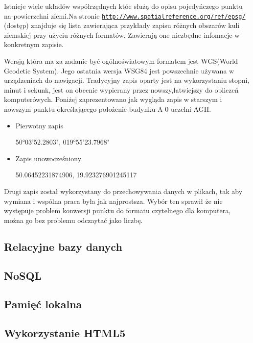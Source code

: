 Istnieje wiele układów współrzędnych któe służą do opisu pojedyńczego punktu na powierzchni ziemi.Na stronie \underline{\texttt{http://www.spatialreference.org/ref/epsg/}} (dostęp) znajduje się lista zawierająca przykłady zapisu różnych obszarów kuli ziemskiej przy użyciu różnych formatów. Zawierają one niezbędne infomacje w konkretnym zapisie.

Wersją która ma za zadanie być ogólnoświatowym formatem jest WGS(World Geodetic System). Jego ostatnia wersja  WSG84 jest powszechnie używana w urządzeniach do nawigacji.
Tradycyjny zapis oparty jest na wykorzystaniu stopni, minut i sekunk, jest on obecnie wypierany przez nowszy,łatwiejszy do obliczeń komputerówych. Poniżej zaprezentowano jak wygląda zapis w starszym i nowszym punktu określającego położenie budynku A-0 uczelni AGH.

\begin{itemize}

\item
Pierwotny zapis

50°03'52.2803", 019°55'23.7968"
\item
Zapis unowocześniony

50.06452231874906, 19.923276901245117
\end{itemize}

Drugi zapis został wykorzystany do przechowywania danych w plikach, tak aby wymiana i wspólna praca była jak najprostsza. Wybór ten sprawił że nie występuje problem konwersji punktu do formatu czytelnego dla komputera, można go bez problemu odczaytać jako liczbę.

\subsection{Relacyjne bazy danych}
\label{sec:relacyjne}

\subsection{NoSQL}
\label{sec:nosql}

\subsection{Pamięć lokalna}
\label{sec:localStorage}

\subsection{Wykorzystanie HTML5}
\label{subsec:htmluse}

